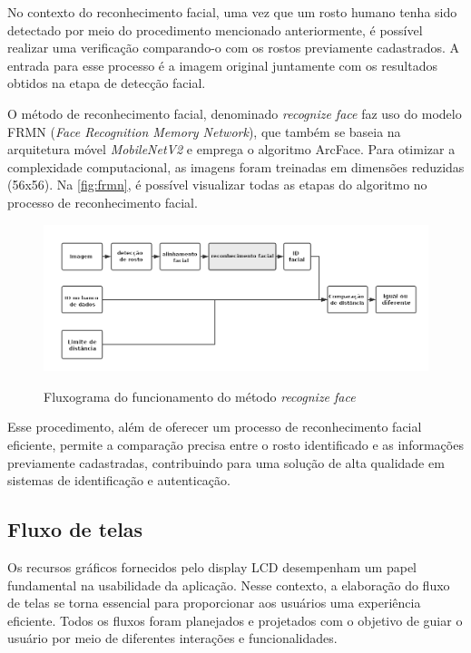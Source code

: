 No contexto do reconhecimento facial, uma vez que um rosto 
humano tenha sido detectado por meio do procedimento 
mencionado anteriormente, é possível realizar uma verificação 
comparando-o com os rostos previamente cadastrados. 
A entrada para esse processo é a imagem original juntamente 
com os resultados obtidos na etapa de detecção facial.

O método de reconhecimento facial, denominado \textit{recognize face}  
faz uso do modelo FRMN (\textit{Face Recognition Memory Network}), que 
também se baseia na arquitetura móvel \textit{MobileNetV2} e emprega o 
algoritmo ArcFace. Para otimizar a complexidade computacional, 
as imagens foram treinadas em dimensões reduzidas (56x56). 
Na \autoref{fig:frmn}, é possível visualizar todas as etapas do algoritmo 
no processo de reconhecimento facial.

\begin{figure}[h!]
    \centering
    \caption{Fluxograma do funcionamento do método \textit{recognize face}}
    \includegraphics[scale=0.45]{figuras/face-recognition.png}
    \label{fig:frmn}
    \centering
\end{figure}

Esse procedimento, além de oferecer um processo de reconhecimento 
facial eficiente, permite a comparação precisa entre o rosto 
identificado e as informações previamente cadastradas, 
contribuindo para uma solução de alta qualidade em sistemas 
de identificação e autenticação.

\subsection{Fluxo de telas}\label{sec:telas}

Os recursos gráficos fornecidos pelo display LCD desempenham um papel 
fundamental na usabilidade da aplicação. Nesse contexto, a elaboração 
do fluxo de telas se torna essencial para proporcionar aos usuários 
uma experiência eficiente. Todos os fluxos foram planejados e 
projetados com o objetivo de guiar o usuário por meio 
de diferentes interações e funcionalidades.

